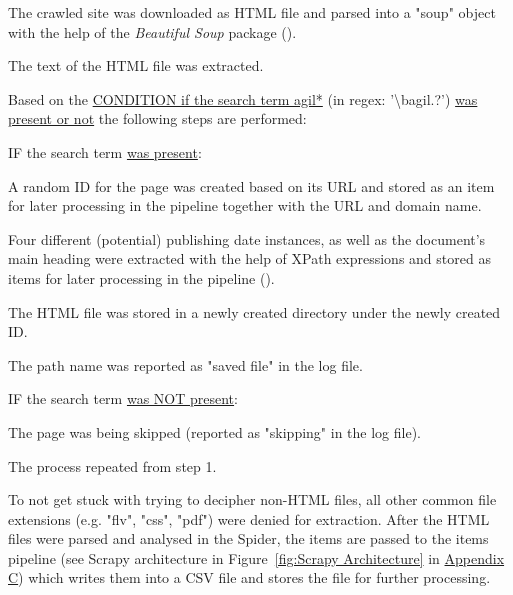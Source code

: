 \begin{compactenum}
    \setlength
    \itemsep{0em}
        \item The crawled site was downloaded as HTML file and parsed into a "soup" object with the help of the \textit{Beautiful Soup} package (\cite{Richardson2007}).
        \item The text of the HTML file was extracted.
        \item Based on the \underline{CONDITION if the search term agil*} (in regex: '\textbackslash bagil.?') \underline{was present or not} the following steps are performed:
        \begin{compactenum}
            \item IF the search term \underline{was present}:
            \begin{compactenum}
                \item A random ID for the page was created  based on its URL and stored as an item for later processing in the pipeline together with the URL and domain name.
                \item Four different (potential) publishing date instances, as well as the document's main heading were extracted with the help of XPath expressions and stored as items for later processing in the pipeline (\cite{W3schools.com2020}).
                \item The HTML file was stored in a newly created directory under the newly created ID.
                \item The path name was reported as "saved file" in the log file. 
            \end{compactenum}
            \item IF the search term \underline{was NOT present}:
            \begin{compactenum}
                \item The page was being skipped (reported as "skipping" in the log file).
            \end{compactenum}
        \end{compactenum}
        \item The process repeated from step 1. 
\end{compactenum}
To not get stuck with trying to decipher non-HTML files, all other common file extensions (e.g. "flv", "css", "pdf") were denied for extraction. After the HTML files were parsed and analysed in the Spider, the items are passed to the items pipeline (see Scrapy architecture in Figure~\ref{fig:Scrapy Architecture} in \href{Appendix C}{Appendix C}) which writes them into a CSV file and stores the file for further processing.

